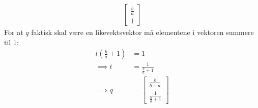 \documentclass[11pt, a4paper, norsk]{NTNUoving}
\begin{document}
\begin{oppgave}
\begin{align*}
\begin{bmatrix}
               \frac{b}{a} \\
               1
           \end{bmatrix}
       \end{align*}
       For at $q$ faktisk skal være en likevektsvektor må elementene i vektoren summere til $1$:
       \begin{align*}
           t(\frac{b}{a} + 1) &= 1 
           \\
           \implies t &= \frac{1}{\frac{b}{a} + 1}
           \\
           \implies q &= \begin{bmatrix}
               \frac{b}{b+a} \\
               \frac{1}{\frac{b}{a} + 1}
           \end{bmatrix}
       \end{align*}
       
   \end{oppgave}
\end{document}
